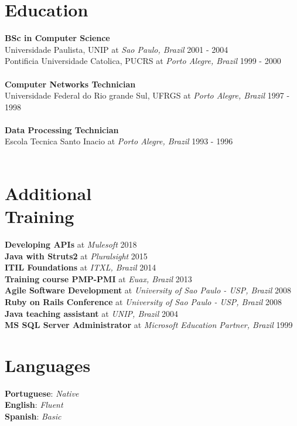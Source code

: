 \documentclass[margin]{res}
\begin{document}
\begin{resume}
\pagebreak
\section{Education}
    \textbf{BSc in Computer Science} \\
        {Universidade Paulista, UNIP} at \textit{Sao Paulo, Brazil} \hfill 2001 - 2004 \\
        {Pontificia Universidade Catolica, PUCRS} at \textit{Porto Alegre, Brazil} \hfill 1999 - 2000 \\
        \\
    \textbf{Computer Networks Technician} \\
        {Universidade Federal do Rio grande Sul, UFRGS} at \textit{Porto Alegre, Brazil} \hfill 1997 - 1998 \\
        \\
    \textbf{Data Processing Technician} \\
        {Escola Tecnica Santo Inacio} at \textit{Porto Alegre, Brazil} \hfill 1993 - 1996 \\
        \\

\section{Additional \\ Training}
\textbf{Developing APIs} at \textit{Mulesoft} \hfill 2018 \\
\textbf{Java with Struts2} at \textit{Pluralsight} \hfill 2015 \\
\textbf{ITIL Foundations} at \textit{ITXL, Brazil} \hfill 2014 \\
\textbf{Training course PMP-PMI} at \textit{Euax, Brazil} \hfill 2013 \\
\textbf{Agile Software Development} at \textit{University of Sao Paulo - USP, Brazil} \hfill 2008 \\
\textbf{Ruby on Rails Conference} at \textit{University of Sao Paulo - USP, Brazil} \hfill 2008 \\
\textbf{Java teaching assistant} at \textit{UNIP, Brazil} \hfill 2004 \\
\textbf{MS SQL Server Administrator} at \textit{Microsoft Education Partner, Brazil} \hfill 1999 \\

\section{Languages} 
    \textbf{Portuguese}: \textit{Native} \\
    \textbf{English}: \textit{Fluent} \\
    \textbf{Spanish}: \textit{Basic} \\


\end{resume}
\end{document}
